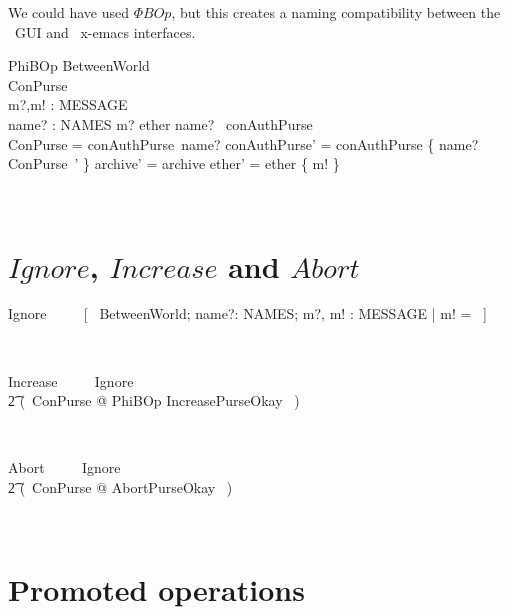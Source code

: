 We could have used $\Phi BOp$, but this creates a naming compatibility
between the \zeves\ GUI and \zeves\ x-emacs interfaces.
%
\begin{LSDef}
\begin{schema}{PhiBOp}
  \Delta BetweenWorld
  \\    \Delta ConPurse
  \\    m?,m! : MESSAGE
  \\    name? : NAMES
  \where
  m? \in ether
  \also
  name? \in \dom~conAuthPurse
  \\    \theta ConPurse = conAuthPurse~name?
  \also
  conAuthPurse' = conAuthPurse \oplus \{ name? \mapsto \theta ConPurse~' \}
  \also
  archive' = archive
  \also
  ether' = ether \cup \{ m! \}
\end{schema}~\end{LSDef}

\section{$Ignore$, $Increase$ and $Abort$}\label{ch5.ignore.increase.abort}

\begin{LSDef}
\begin{zed}
  Ignore ~~~~ [~ \Xi BetweenWorld; name?: NAMES; m?, m! : MESSAGE | m! = \bot ~]
\end{zed}~\end{LSDef}

\begin{LSDef}
\begin{zed}
  Increase ~~~~ Ignore
  \\ \t2                \lor (~\exists \Delta ConPurse @
  PhiBOp \land IncreasePurseOkay ~)
\end{zed}~\end{LSDef}

\begin{LSDef}
\begin{zed}
  Abort ~~~~ Ignore
  \\ \t2                \lor (~\exists \Delta ConPurse @
  AbortPurseOkay \land [~ PhiBOp | m! = \bot ~]~)
\end{zed}~\end{LSDef}

\section{Promoted operations}\label{ch5.promoted}

